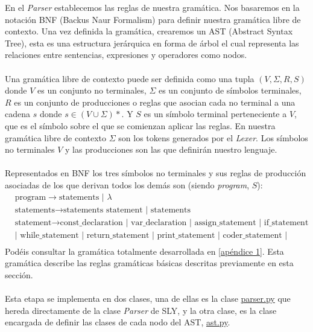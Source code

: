En el \textit{Parser} establecemos las reglas de nuestra gramática. Nos basaremos en la notación BNF (Backus Naur Formalism) para definir nuestra gramática libre de contexto. Una vez definida la gramática, crearemos un AST (Abstract Syntax Tree), esta es una estructura jerárquica en forma de árbol el cual representa las relaciones entre sentencias, expresiones y operadores como nodos.\\\\
Una gramática libre de contexto puede ser definida como una tupla $(V, \Sigma, R, S)$ donde $V$ es un conjunto no terminales, $\Sigma$ es un conjunto de símbolos terminales, $R$ es un conjunto de producciones o reglas que asocian cada no terminal a una cadena $s$ donde $s \in (V \cup \Sigma)*$. Y $S$ es un símbolo terminal perteneciente a $V$, que es el símbolo sobre el que se comienzan aplicar las reglas. En nuestra gramática libre de contexto $\Sigma$ son los tokens generados por el \textit{Lexer}. Los símbolos no terminales $V$ y las producciones son las que definirán nuestro lenguaje. \\\\
Representados en BNF los tres símbolos no terminales y sus reglas de producción asociadas de los que derivan todos los demás son (siendo \textit{program}, $S$):
\begin{align*}
    &\text{program} \rightarrow \text{statements | $\lambda$ }  \\
    &\text{statements} \rightarrow \text{statements statement | statements }  \\
    &\text{statement} \rightarrow \text{const\_declaration | var\_declaration | assign\_statement | if\_statement }  \\
     &\text{| while\_statement | return\_statement | print\_statement | coder\_statement | decoder\_statement }  \\
\end{align*}
Podéis consultar la gramática totalmente desarrollada en \ref{apéndice 1}. Esta gramática describe las reglas gramáticas básicas descritas previamente en esta sección.\\\\
\noindent Esta etapa se implementa en dos clases, una de ellas es la clase \href{https://github.com/domingoUnican/TFGPedroCastro/blob/main/code/compilerGoneFSR/gone/parser.py}{parser.py} que hereda directamente de la clase \textit{Parser} de SLY, y la otra clase, es la clase encargada de definir las clases de cada nodo del AST, \href{https://github.com/domingoUnican/TFGPedroCastro/blob/main/code/compilerGoneFSR/gone/ast.py}{ast.py}. \\\\
